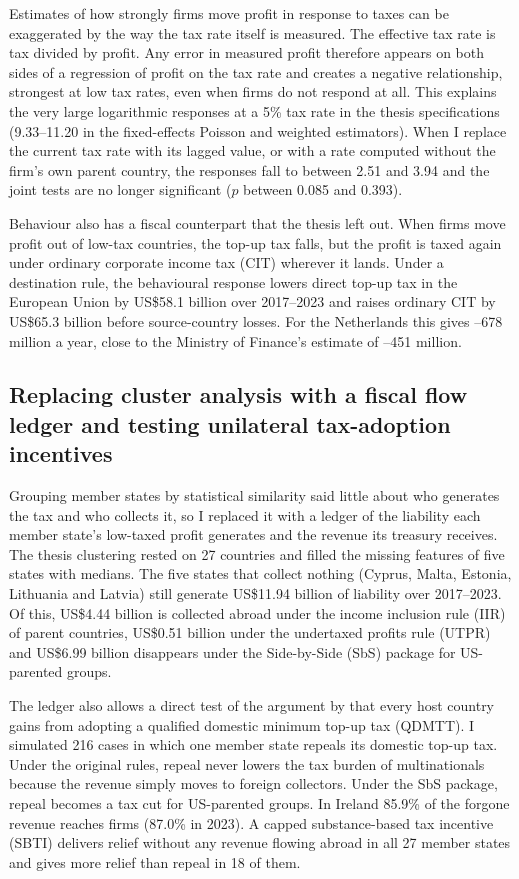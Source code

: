 \documentclass[11pt,a4paper]{article}
\newcommand{\EUR}{\texteuro}
\newcommand{\usd}{US\$}
\begin{document}
Estimates of how strongly firms move profit in response to taxes can be exaggerated by the way the tax rate itself is measured. The effective tax rate is tax divided by profit. Any error in measured profit therefore appears on both sides of a regression of profit on the tax rate and creates a negative relationship, strongest at low tax rates, even when firms do not respond at all. This explains the very large logarithmic responses at a 5\% tax rate in the thesis specifications (9.33–11.20 in the fixed-effects Poisson and weighted estimators). When I replace the current tax rate with its lagged value, or with a rate computed without the firm's own parent country, the responses fall to between 2.51 and 3.94 and the joint tests are no longer significant ($p$ between 0.085 and 0.393).

Behaviour also has a fiscal counterpart that the thesis left out. When firms move profit out of low-tax countries, the top-up tax falls, but the profit is taxed again under ordinary corporate income tax (CIT) wherever it lands. Under a destination rule, the behavioural response lowers direct top-up tax in the European Union by \usd58.1 billion over 2017–2023 and raises ordinary CIT by \usd65.3 billion before source-country losses. For the Netherlands this gives \EUR431–678 million a year, close to the Ministry of Finance's estimate of \EUR397–451 million.

\subsection{Replacing cluster analysis with a fiscal flow ledger and testing unilateral tax-adoption incentives}

Grouping member states by statistical similarity said little about who generates the tax and who collects it, so I replaced it with a ledger of the liability each member state's low-taxed profit generates and the revenue its treasury receives. The thesis clustering rested on 27 countries and filled the missing features of five states with medians. The five states that collect nothing (Cyprus, Malta, Estonia, Lithuania and Latvia) still generate \usd11.94 billion of liability over 2017–2023. Of this, \usd4.44 billion is collected abroad under the income inclusion rule (IIR) of parent countries, \usd0.51 billion under the undertaxed profits rule (UTPR) and \usd6.99 billion disappears under the Side-by-Side (SbS) package for US-parented groups.

The ledger also allows a direct test of the argument by \citet{devereux2022} that every host country gains from adopting a qualified domestic minimum top-up tax (QDMTT). I simulated 216 cases in which one member state repeals its domestic top-up tax. Under the original rules, repeal never lowers the tax burden of multinationals because the revenue simply moves to foreign collectors. Under the SbS package, repeal becomes a tax cut for US-parented groups. In Ireland 85.9\% of the forgone revenue reaches firms (87.0\% in 2023). A capped substance-based tax incentive (SBTI) delivers relief without any revenue flowing abroad in all 27 member states and gives more relief than repeal in 18 of them.
\end{document}
